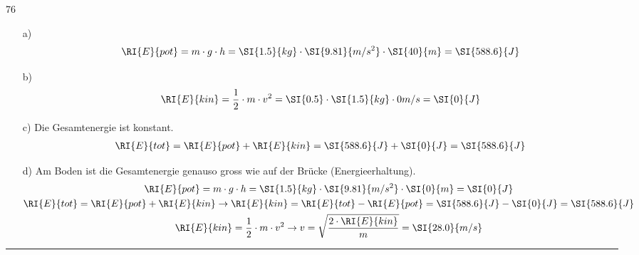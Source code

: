 \documentclass[12pt,a4paper,twoside]{article}
\begin{document}
\begin{ex@loesung}{76}
\begin{itemize}
\item[a)]
\begin{eqnarray*}
\RI{E}{pot}=m\cdot g\cdot h=\SI{1.5}{kg}\cdot\SI{9.81}{m/s^2}\cdot\SI{40}{m}=\SI{588.6}{J}
\end{eqnarray*}
\item[b)]
\begin{eqnarray*}
\RI{E}{kin}=\frac{1}{2}\cdot m\cdot v^2=\SI{0.5}\cdot\SI{1.5}{kg}\cdot{0}{m/s}=\SI{0}{J}
\end{eqnarray*}
\item[c)] Die Gesamtenergie ist konstant.
\begin{eqnarray*}
\RI{E}{tot}=\RI{E}{pot} + \RI{E}{kin}=\SI{588.6}{J} + \SI{0}{J}=\SI{588.6}{J}
\end{eqnarray*}
\item[d)] Am Boden ist die Gesamtenergie genauso gross wie auf der Brücke (Energieerhaltung).
\begin{gather*}
\RI{E}{pot}=m\cdot g\cdot h=\SI{1.5}{kg}\cdot\SI{9.81}{m/s^2}\cdot\SI{0}{m}=\SI{0}{J}\\
\RI{E}{tot}=\RI{E}{pot} + \RI{E}{kin} \to \RI{E}{kin}=\RI{E}{tot}-\RI{E}{pot}=\SI{588.6}{J}-\SI{0}{J}=\SI{588.6}{J}\\
\RI{E}{kin}=\frac{1}{2}\cdot m\cdot v^2 \to v=\sqrt{\frac{2\cdot \RI{E}{kin}}{m}} =\SI{28.0}{m/s}
\end{gather*}
\end{itemize}
\hrule \end{ex@loesung}
\end{document}
